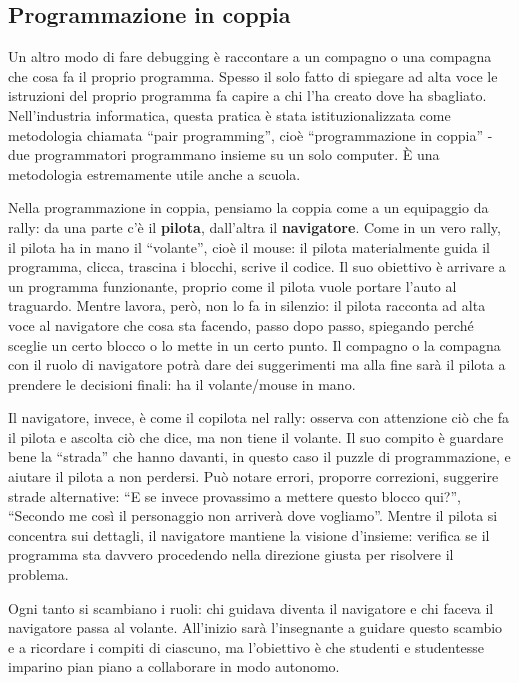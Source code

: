 \subsection{Programmazione in coppia }\label{programmazione-in-coppia}

Un altro modo di fare debugging è raccontare a un compagno o una compagna che cosa fa il proprio programma. Spesso il solo fatto di spiegare ad alta voce le istruzioni del proprio programma fa capire a chi l'ha creato dove ha sbagliato. Nell'industria informatica, questa pratica è stata istituzionalizzata come metodologia chiamata ``pair programming'', cioè ``programmazione in coppia'' - due programmatori programmano insieme su un solo computer. È una metodologia estremamente utile anche a scuola.

Nella programmazione in coppia, pensiamo la coppia come a un equipaggio da rally: da una parte c'è il \textbf{pilota}, dall'altra il \textbf{navigatore}. Come in un vero rally, il pilota ha in mano il ``volante'', cioè il mouse: il pilota materialmente guida il programma, clicca, trascina i blocchi, scrive il codice. Il suo obiettivo è arrivare a un programma funzionante, proprio come il pilota vuole portare l'auto al traguardo. Mentre lavora, però, non lo fa in silenzio: il pilota racconta ad alta voce al navigatore che cosa sta facendo, passo dopo passo, spiegando perché sceglie un certo blocco o lo mette in un certo punto. Il compagno o la compagna con il ruolo di navigatore potrà dare dei suggerimenti ma alla fine sarà il pilota a prendere le decisioni finali: ha il volante/mouse in mano.

Il navigatore, invece, è come il copilota nel rally: osserva con attenzione ciò che fa il pilota e ascolta ciò che dice, ma non tiene il volante. Il suo compito è guardare bene la ``strada'' che hanno davanti, in questo caso il puzzle di programmazione, e aiutare il pilota a non perdersi. Può notare errori, proporre correzioni, suggerire strade alternative: ``E se invece provassimo a mettere questo blocco qui?'', ``Secondo me così il personaggio non arriverà dove vogliamo''. Mentre il pilota si concentra sui dettagli, il navigatore mantiene la visione d'insieme: verifica se il programma sta davvero procedendo nella direzione giusta per risolvere il problema.

Ogni tanto si scambiano i ruoli: chi guidava diventa il navigatore e chi faceva il navigatore passa al volante. All'inizio sarà l'insegnante a guidare questo scambio e a ricordare i compiti di ciascuno, ma l'obiettivo è che studenti e studentesse imparino pian piano a collaborare in modo autonomo.

